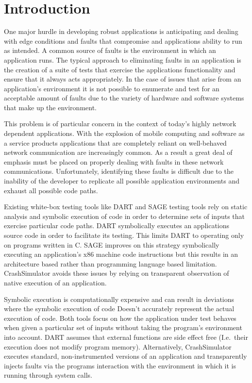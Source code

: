 \section{Introduction}

    One major hurdle in developing robust applications is anticipating and dealing with edge conditions and faults that
    compromise and applications ability to run as intended. A common source of faults is the environment in which an
    application runs. The typical approach to eliminating faults in an application is the creation of a suite of tests that
    exercise the applications functionality and ensure that it always acts appropriately. In the case of issues that arise
    from an application's environment it is not possible to enumerate and test for an acceptable amount of faults due to the
    variety of hardware and software systems that make up the environment.

    This problem is of particular concern in the context of today's highly network dependent applications. With the
    explosion of mobile computing and software as a service products applications that are completely reliant on
    well-behaved network communication are increasingly common. As a result a great deal of emphasis must be placed on
    properly dealing with faults in these network communications. Unfortunately, identifying these faults is difficult due
    to the inability of the developer to replicate all possible application environments and exhaust all possible code
    paths.

    Existing white-box testing tools like DART and SAGE testing tools rely on static analysis and symbolic execution of
    code in order to determine sets of inputs that exercise particular code paths. DART symbolically executes an
    applications source code in order to facilitate its testing. This limits DART to operating only on programs written
    in C. SAGE improves on this strategy symbolically executing an application's x86 machine code instructions but this
    results in an architecture based rather than programming language based limitation. CrashSimulator avoids these
    issues by relying on transparent observation of native execution of an application.

    Symbolic execution is computationally expensive and can result in deviations where the symbolic execution of code
    Doesn't accurately represent the actual execution of code.
    Both tools focus on how the application under test behaves when given a particular set of inputs without taking the
    program's environment into account. DART assumes that external functions are side effect free (I.e.\ their execution
    does not modify program memory). Alternatively, CrashSimulator executes standard, non-instrumented versions of an
    application and transparently injects faults via the programs interaction with the environment in which it is
    running through system calls.

